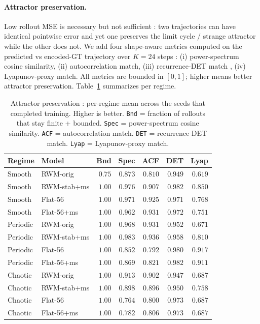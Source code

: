 \documentclass[11pt,a4paper]{article}
\begin{document}
\paragraph{Attractor preservation.} Low rollout MSE is necessary but not
sufficient : two trajectories can have identical pointwise error and yet
one preserves the limit cycle / strange attractor while the other does not.
We add four shape-aware metrics computed on the predicted vs encoded-GT
trajectory over $K{=}24$ steps : (i) power-spectrum cosine similarity,
(ii) autocorrelation match, (iii) recurrence-DET match
\cite{marwan2007recurrence}, (iv) Lyapunov-proxy match. All metrics are
bounded in $[0, 1]$; higher means better attractor preservation.
Table~\ref{tab:rwm-rollout-attractor} summarizes per regime.

\begin{table}[h]
\centering
\caption{Attractor preservation : per-regime mean across the seeds
that completed training. Higher is better. \texttt{Bnd} = fraction of
rollouts that stay finite + bounded. \texttt{Spec} = power-spectrum
cosine similarity. \texttt{ACF} = autocorrelation match. \texttt{DET}
= recurrence DET match. \texttt{Lyap} = Lyapunov-proxy match.}
\label{tab:rwm-rollout-attractor}
\begin{tabular}{llrrrrr}
\toprule
Regime & Model & Bnd & Spec & ACF & DET & Lyap \\
\midrule
Smooth   & RWM-orig    & $0.75$ & $0.873$ & $0.810$ & $0.949$ & $0.619$ \\
Smooth   & RWM-stab+ms & $1.00$ & $0.976$ & $0.907$ & $0.982$ & $0.850$ \\
Smooth   & Flat-56     & $1.00$ & $0.971$ & $0.925$ & $0.971$ & $0.768$ \\
Smooth   & Flat-56+ms  & $1.00$ & $0.962$ & $0.931$ & $0.972$ & $0.751$ \\
Periodic & RWM-orig    & $1.00$ & $0.968$ & $0.931$ & $0.952$ & $0.671$ \\
Periodic & RWM-stab+ms & $1.00$ & $0.983$ & $0.936$ & $0.958$ & $0.810$ \\
Periodic & Flat-56     & $1.00$ & $0.852$ & $0.792$ & $0.980$ & $0.917$ \\
Periodic & Flat-56+ms  & $1.00$ & $0.869$ & $0.821$ & $0.982$ & $0.911$ \\
Chaotic  & RWM-orig    & $1.00$ & $0.913$ & $0.902$ & $0.947$ & $0.687$ \\
Chaotic  & RWM-stab+ms & $1.00$ & $0.898$ & $0.896$ & $0.950$ & $0.758$ \\
Chaotic  & Flat-56     & $1.00$ & $0.764$ & $0.800$ & $0.973$ & $0.687$ \\
Chaotic  & Flat-56+ms  & $1.00$ & $0.782$ & $0.806$ & $0.973$ & $0.687$ \\
\bottomrule
\end{tabular}
\end{table}
\end{document}
